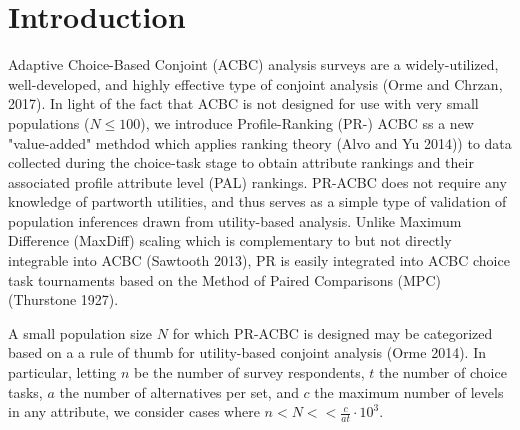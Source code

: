 \documentclass[a4paper, 12pt]{article}
\begin{document}


 \vspace{1in}

\section{Introduction}

Adaptive Choice-Based Conjoint (ACBC) analysis surveys are a widely-utilized, well-developed, and highly effective  type of conjoint analysis (Orme and Chrzan, 2017).  In light of the fact that ACBC is not designed for use with very small populations ($N\le 100$),   we introduce Profile-Ranking (PR-) ACBC ss a new "value-added" methdod which applies ranking theory (Alvo and Yu 2014)) to data collected during the choice-task stage  to obtain attribute rankings and their associated profile attribute level (PAL) rankings.  PR-ACBC does not require any knowledge of partworth utilities, and thus serves as a simple type of validation of population inferences drawn from utility-based analysis. Unlike Maximum Difference (MaxDiff) scaling which is complementary to but not directly integrable into ACBC  (Sawtooth 2013), PR is easily integrated into ACBC choice task tournaments based on  the Method of Paired Comparisons (MPC) (Thurstone 1927).    

A small population size $N$ for which PR-ACBC is designed  may be categorized based on a a rule of thumb for utility-based conjoint analysis (Orme 2014). In particular, letting $n$ be the number of survey respondents, $t$ the number of choice tasks, $a$ the number of alternatives per set, and $c$ the maximum number of levels in any attribute, we consider cases where $n < N << \frac{c}{at} \cdot 10^3$. 
\end{document}
